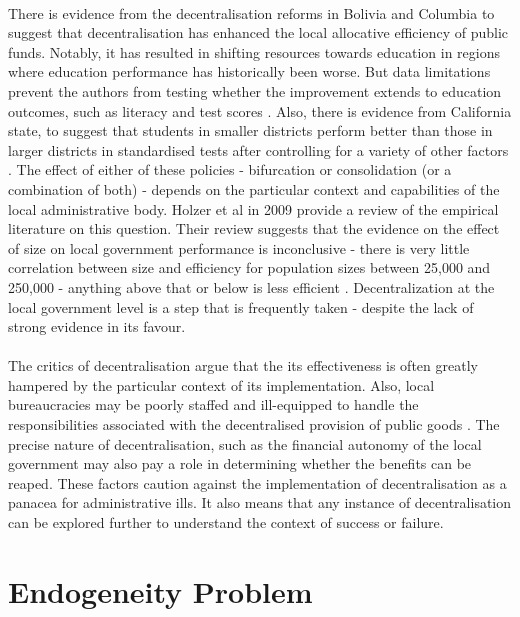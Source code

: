 \documentclass[12pt, a4paper]{article}
\begin{document}
\paragraph{} There is evidence from the decentralisation reforms in Bolivia and Columbia to suggest that decentralisation has enhanced the local allocative efficiency of public funds. Notably, it has resulted in shifting resources towards education in regions where education performance has historically been worse. But data limitations prevent the authors from testing whether the improvement extends to education outcomes, such as literacy and test scores \parencite{faguet2008decentralization}. Also, there is evidence from California state, to suggest that students in smaller districts perform better than those in larger districts in standardised tests after controlling for a variety of other factors \parencite{driscoll2003school}. The effect of either of these policies - bifurcation or consolidation (or a combination of both) - depends on the particular context and capabilities of the local administrative body. Holzer et al in 2009 provide a review of the empirical literature on this question. Their review suggests that the evidence on the effect of size on local government performance is inconclusive - there is very little correlation between size and efficiency for population sizes between 25,000 and 250,000 - anything above that or below is less efficient \parencite{holzer2009literature}. Decentralization at the local government level is a step that is frequently taken - despite the lack of strong evidence in its favour. 

\paragraph{} The critics of decentralisation argue that the its effectiveness is often greatly hampered by the particular context of its implementation.  Also, local bureaucracies may be poorly staffed and ill-equipped to handle the responsibilities associated with the decentralised provision of public goods \parencite{prud1995dangers}. The precise nature of decentralisation, such as the financial autonomy of the local government may also pay a role in determining whether the benefits can be reaped. These factors caution against the implementation of decentralisation as a panacea for administrative ills. It also means that any instance of decentralisation can be explored further to understand the context of success or failure.

\section*{Endogeneity Problem}
\end{document}
